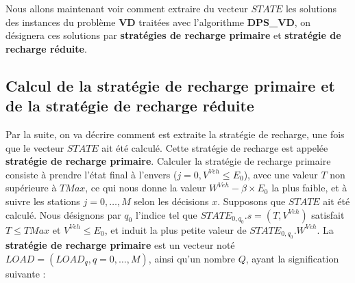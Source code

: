 Nous allons maintenant voir comment extraire du vecteur $STATE$ les solutions des instances du problème \textbf{VD} traitées avec l'algorithme \textbf{DPS\_VD}, on désignera ces solutions par \textbf{stratégies de recharge primaire} et \textbf{stratégie de recharge réduite}.

\subsection{Calcul de la stratégie de recharge primaire et de la stratégie de recharge réduite}
\label{recharge_reduite}
Par la suite, on va décrire comment est extraite la stratégie de recharge, une fois que le vecteur $STATE$ ait été calculé. Cette stratégie de recharge est appelée \textbf{stratégie de recharge primaire}.
Calculer la stratégie de recharge primaire consiste à prendre l'état final à l'envers ($j = 0, V^{Veh} \leq E_0$), avec une valeur $T$ non supérieure à $TMax$, ce qui nous donne la valeur $W^{Veh} - \beta \times E_0$ la plus faible, et à suivre les stations $j = 0,\dots, M$ selon les décisions $x$.
Supposons que $STATE$ ait été calculé. Nous désignons par $q_0$ l'indice tel que $STATE_{0, q_0}.s = (T, V^{Veh})$ satisfait $T \leq TMax$ et $V^{Veh} \leq E_0$, et induit la plus petite valeur de $STATE_{0, q_0}.W^{Veh}$. 
La \textbf{stratégie de recharge primaire} est un vecteur noté $LOAD =(LOAD_q, q=0, \dots,M)$, ainsi qu'un nombre $Q$, ayant la signification suivante :

